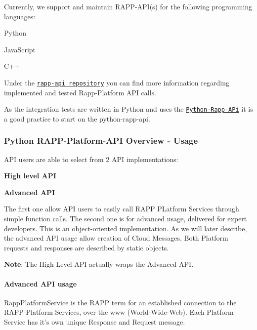 Currently, we support and maintain R\-A\-P\-P-\/\-A\-P\-I(s) for the following programming languages\-:


\begin{DoxyItemize}
\item Python
\item Java\-Script
\item C++
\end{DoxyItemize}

Under the \href{https://github.com/rapp-project/rapp-api}{\tt rapp-\/api repository} you can find more information regarding implemented and tested Rapp-\/\-Platform A\-P\-I calls.

As the integration tests are written in Python and uses the \href{https://github.com/rapp-project/rapp-api/tree/master/python}{\tt Python-\/\-Rapp-\/\-A\-Pi} it is a good practice to start on the python-\/rapp-\/api.





\subsubsection*{Python R\-A\-P\-P-\/\-Platform-\/\-A\-P\-I Overview -\/ Usage}

A\-P\-I users are able to select from 2 A\-P\-I implementations\-:


\begin{DoxyItemize}
\item {\bfseries High level A\-P\-I}
\item {\bfseries Advanced A\-P\-I}
\end{DoxyItemize}

The first one allow A\-P\-I users to easily call R\-A\-P\-P P\-Latform Services through simple function calls. The second one is for advanced usage, delivered for expert developers. This is an object-\/oriented implementation. As we will later describe, the advanced A\-P\-I usage allow creation of Cloud Messages. Both Platform requests and responses are described by static objects.

{\bfseries Note}\-: The High Level A\-P\-I actually wraps the Advanced A\-P\-I.

\paragraph*{Advanced A\-P\-I usage}

{\ttfamily Rapp\-Platform\-Service} is the R\-A\-P\-P term for an established connection to the R\-A\-P\-P-\/\-Platform Services, over the www (World-\/\-Wide-\/\-Web). Each Platform Service has it's own unique Response and Request message.

